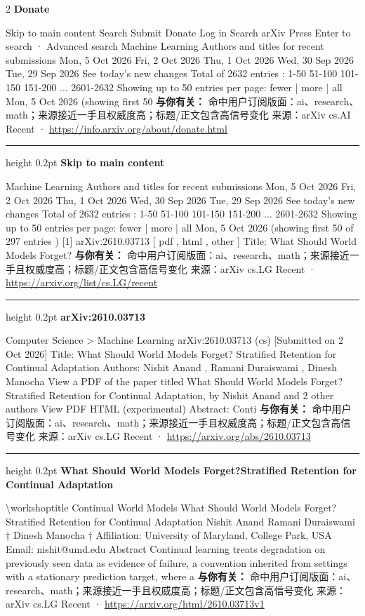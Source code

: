 \documentclass[10.5pt]{ctexart}
\begin{document}
\begin{multicols}{2}
{\large\bfseries Donate}\par
Skip to main content Search Submit Donate Log in Search arXiv Press Enter to search · Advanced search Machine Learning Authors and titles for recent submissions Mon, 5 Oct 2026 Fri, 2 Oct 2026 Thu, 1 Oct 2026 Wed, 30 Sep 2026 Tue, 29 Sep 2026 See today's new changes Total of 2632 entries : 1-50 51-100 101-150 151-200 ... 2601-2632 Showing up to 50 entries per page: fewer | more | all Mon, 5 Oct 2026 (showing first 50
\textbf{与你有关：} 命中用户订阅版面：ai、research、math；来源接近一手且权威度高；标题/正文包含高信号变化
{\footnotesize\color{ormuted} 来源：arXiv cs.AI Recent · \url{https://info.arxiv.org/about/donate.html}}
\vspace{2mm}
\hrule height 0.2pt
\vspace{2mm}
{\large\bfseries Skip to main content}\par
Machine Learning Authors and titles for recent submissions Mon, 5 Oct 2026 Fri, 2 Oct 2026 Thu, 1 Oct 2026 Wed, 30 Sep 2026 Tue, 29 Sep 2026 See today's new changes Total of 2632 entries : 1-50 51-100 101-150 151-200 ... 2601-2632 Showing up to 50 entries per page: fewer | more | all Mon, 5 Oct 2026 (showing first 50 of 297 entries ) [1] arXiv:2610.03713 [ pdf , html , other ] Title: What Should World Models Forget? 
\textbf{与你有关：} 命中用户订阅版面：ai、research、math；来源接近一手且权威度高；标题/正文包含高信号变化
{\footnotesize\color{ormuted} 来源：arXiv cs.LG Recent · \url{https://arxiv.org/list/cs.LG/recent}}
\vspace{2mm}
\hrule height 0.2pt
\vspace{2mm}
{\large\bfseries arXiv:2610.03713}\par
Computer Science > Machine Learning arXiv:2610.03713 (cs) [Submitted on 2 Oct 2026] Title: What Should World Models Forget? Stratified Retention for Continual Adaptation Authors: Nishit Anand , Ramani Duraiswami , Dinesh Manocha View a PDF of the paper titled What Should World Models Forget? Stratified Retention for Continual Adaptation, by Nishit Anand and 2 other authors View PDF HTML (experimental) Abstract: Conti
\textbf{与你有关：} 命中用户订阅版面：ai、research、math；来源接近一手且权威度高；标题/正文包含高信号变化
{\footnotesize\color{ormuted} 来源：arXiv cs.LG Recent · \url{https://arxiv.org/abs/2610.03713}}
\vspace{2mm}
\hrule height 0.2pt
\vspace{2mm}
{\large\bfseries What Should World Models Forget?Stratified Retention for Continual Adaptation}\par
\textbackslash{}workshoptitle Continual World Models What Should World Models Forget? Stratified Retention for Continual Adaptation Nishit Anand Ramani Duraiswami † Dinesh Manocha † Affiliation: University of Maryland, College Park, USA Email: nishit@umd.edu Abstract Continual learning treats degradation on previously seen data as evidence of failure, a convention inherited from settings with a stationary prediction target, where a
\textbf{与你有关：} 命中用户订阅版面：ai、research、math；来源接近一手且权威度高；标题/正文包含高信号变化
{\footnotesize\color{ormuted} 来源：arXiv cs.LG Recent · \url{https://arxiv.org/html/2610.03713v1}}
\end{multicols}
\end{document}
